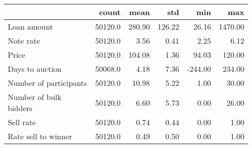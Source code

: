 \begin{tabular}{lrrrrr}
\toprule
{} &    count &    mean &     std &     min &      max \\
\midrule
Loan amount            &  50120.0 &  280.90 &  126.22 &   26.16 &  1470.00 \\
Note rate              &  50120.0 &    3.56 &    0.41 &    2.25 &     6.12 \\
Price                  &  50120.0 &  104.08 &    1.36 &   94.03 &   120.00 \\
Days to auction        &  50068.0 &    4.18 &    7.36 & -244.00 &   234.00 \\
Number of participants &  50120.0 &   10.98 &    5.22 &    1.00 &    30.00 \\
Number of bulk bidders &  50120.0 &    6.60 &    5.73 &    0.00 &    26.00 \\
Sell rate              &  50120.0 &    0.74 &    0.44 &    0.00 &     1.00 \\
Rate sell to winner    &  50120.0 &    0.49 &    0.50 &    0.00 &     1.00 \\
\bottomrule
\end{tabular}
